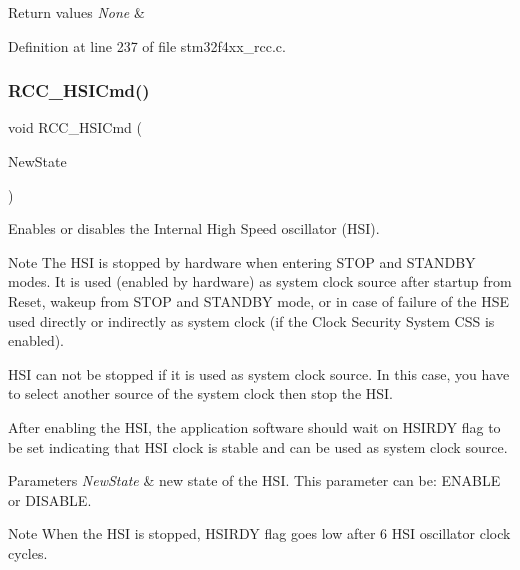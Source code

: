 \begin{DoxyRetVals}{Return values}
{\em None} & \\
\hline
\end{DoxyRetVals}


Definition at line 237 of file stm32f4xx\+\_\+rcc.\+c.

\mbox{\label{group___r_c_c_ga0c6772a1e43765909495f57815ef69e2}} 
\subsubsection{\texorpdfstring{R\+C\+C\+\_\+\+H\+S\+I\+Cmd()}{RCC\_HSICmd()}}
{\footnotesize\ttfamily void R\+C\+C\+\_\+\+H\+S\+I\+Cmd (\begin{DoxyParamCaption}\item[{Functional\+State}]{New\+State }\end{DoxyParamCaption})}



Enables or disables the Internal High Speed oscillator (H\+SI). 

\begin{DoxyNote}{Note}
The H\+SI is stopped by hardware when entering S\+T\+OP and S\+T\+A\+N\+D\+BY modes. It is used (enabled by hardware) as system clock source after startup from Reset, wakeup from S\+T\+OP and S\+T\+A\+N\+D\+BY mode, or in case of failure of the H\+SE used directly or indirectly as system clock (if the Clock Security System C\+SS is enabled). 

H\+SI can not be stopped if it is used as system clock source. In this case, you have to select another source of the system clock then stop the H\+SI. 

After enabling the H\+SI, the application software should wait on H\+S\+I\+R\+DY flag to be set indicating that H\+SI clock is stable and can be used as system clock source. 
\end{DoxyNote}

\begin{DoxyParams}{Parameters}
{\em New\+State} & new state of the H\+SI. This parameter can be\+: E\+N\+A\+B\+LE or D\+I\+S\+A\+B\+LE. \\
\hline
\end{DoxyParams}
\begin{DoxyNote}{Note}
When the H\+SI is stopped, H\+S\+I\+R\+DY flag goes low after 6 H\+SI oscillator clock cycles. 
\end{DoxyNote}

